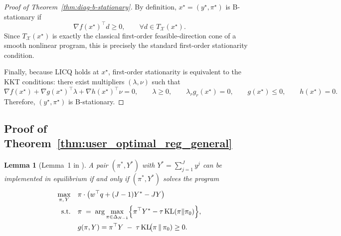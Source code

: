 \documentclass{article}
\newtheorem{lemma}{Lemma}
\begin{document}
\begin{proof}[Proof of Theorem~\ref{thm:diag-b-stationary}]
By definition, \(x^\star=(y^\star,\pi^\star)\) is B-stationary if
\[
\nabla f(x^\star)^\top d\ge 0,\qquad \forall d\in T_{\mathcal X}(x^\star).
\]
Since \(T_{\mathcal X}(x^\star)\) is exactly the classical first-order feasible-direction cone of a smooth nonlinear program, this is precisely the standard first-order stationarity condition.

Finally, because LICQ holds at \(x^\star\), first-order stationarity is equivalent to the KKT conditions: there exist multipliers \((\lambda,\nu)\) such that
\[
\nabla f(x^\star)+\nabla g(x^\star)^\top\lambda+\nabla h(x^\star)^\top\nu=0,\qquad
\lambda\ge 0,\qquad
\lambda_r g_r(x^\star)=0,\qquad
g(x^\star)\le 0,\qquad
h(x^\star)=0.
\]
Therefore, \((y^\star,\pi^\star)\) is B-stationary.
\end{proof}

\subsection{Proof of Theorem~\ref{thm:user_optimal_reg_general}}
\begin{lemma}[Lemma~1 in \citep{bernheim1986common}]\label{lemma:equilibrium}
A pair $(\pi^*,Y^*)$ with $Y^*=\sum_{j=1}^J y^j$ can be implemented in equilibrium if and only if $(\pi^*,Y^*)$ solves the program
\begin{align*}
\max_{\pi,\,Y}\quad & \pi \cdot \bigl(w^\top q+(J-1)Y^* - J Y\bigr) \\
\text{s.t.}\quad 
& \pi \;=\; \arg\max_{\pi\in\Delta_{N-1}}\Bigl\{\pi^\top Y^*-\tau\,\mathrm{KL}(\pi\|\pi_0)\Bigr\}, \\
& g(\pi,Y) = \pi^\top Y\;-\;\tau\,\mathrm{KL}\!\bigl(\pi\,\|\,\pi_0) \geq 0. \\
\end{align*}
\end{lemma}
\end{document}
